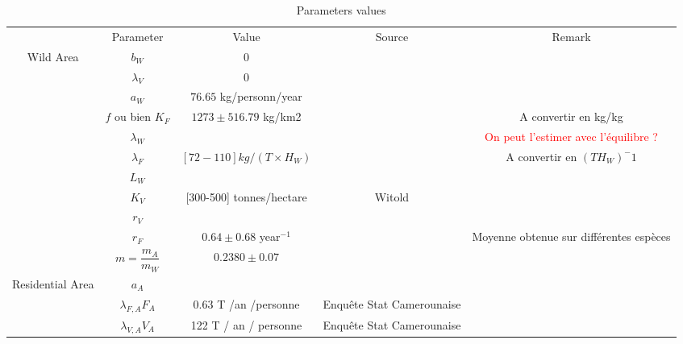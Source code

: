 \documentclass{article}
\newcommand{\lfa}{\lambda_{F, A}}
\newcommand{\lva}{\lambda_{V, A}}
\newcommand{\lfw}{\lambda_{F}}
\newcommand{\lvw}{\lambda_{V}}
\newcommand{\lfv}{\lambda_{W}}
\newcommand{\marc}[1]{\textcolor{red}{#1}}
\begin{document}
\begin{table}[!ht]
\centering
\caption{Parameters values}
\begin{tabular}{c|c|c|c|c}
& Parameter & Value & Source & Remark \\
\cline{1-5}
\multirow{10}{*}{Wild Area} & $b_W$ & 0 & \cite{loung_pygmees_1996, koppert_consommation_1996, bennett_carrying_2000} & \\
& $\lvw$ & 0 & \cite{loung_pygmees_1996, koppert_consommation_1996, bennett_carrying_2000} &\\
& $a_W$ & $76.65$ kg/personn/year & \cite{koppert_consommation_1996, bennett_carrying_2000} \\
& $f$ ou bien $K_F$ & $1273 \pm 516.79$ kg/km2 & \cite{bennett_carrying_2000} & A convertir en kg/kg\\
& $\lfv$ & & & \marc{On peut l'estimer avec l'équilibre ?}\\
& $\lfw$ & $[72-110] kg/(T\times H_W)$ &\cite{avila_interpreting_2019, jones_consequences_2020} & A convertir en $(T H_W)^-1$\\
& $L_W$ \\
& $K_V$ & [300-500] tonnes/hectare & Witold & \\
& $r_V$ \\
& $r_F$ & $0.64 \pm 0.68$ year$^{-1}$ & \cite{bennett_carrying_2000} & Moyenne obtenue sur différentes espèces\\
& $m= \dfrac{m_A}{m_W}$ & $0.2380 \pm 0.07$ & \cite{avila_interpreting_2019} \\
\hline
\multirow{4}{*}{Residential Area} & $a_A$ & & \\
 & $\lfa F_A $ & 0.63 T /an /personne & Enquête Stat Camerounaise \\
 & $\lva V_A $ &  122 T / an / personne & Enquête Stat Camerounaise
\end{tabular}
\end{table}
\end{document}
